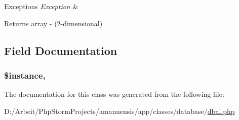 \begin{DoxyExceptions}{Exceptions}
{\em Exception} & \\
\hline
\end{DoxyExceptions}
\begin{DoxyReturn}{Returns}
array -\/ (2-\/dimensional) 
\end{DoxyReturn}


\subsection{Field Documentation}
\hypertarget{a00022_ad9d7ce33ebb142b70e58b68052ca0ea8}{}
\subsubsection[{\$instance}]{\setlength{\rightskip}{0pt plus 5cm}\$instance\hspace{0.3cm}{\ttfamily [static]}, {\ttfamily [protected]}}\label{a00022_ad9d7ce33ebb142b70e58b68052ca0ea8}


The documentation for this class was generated from the following file\+:\begin{DoxyCompactItemize}
\item 
D\+:/\+Arbeit/\+Php\+Storm\+Projects/amanuensis/app/classes/database/\hyperlink{a00088}{dbal.\+php}\end{DoxyCompactItemize}
